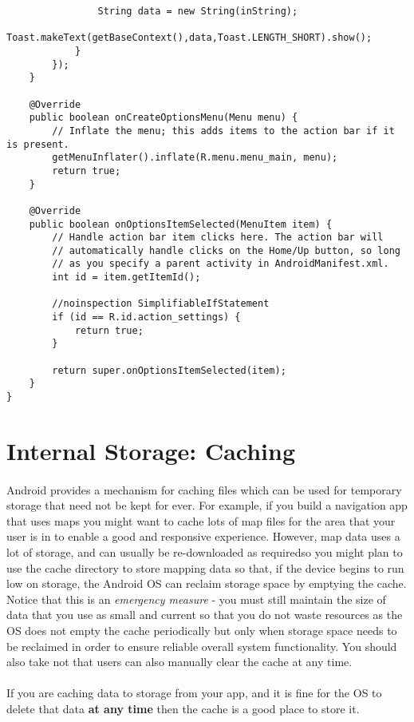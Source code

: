 \begin{lstlisting}
                String data = new String(inString);
                Toast.makeText(getBaseContext(),data,Toast.LENGTH_SHORT).show();
            }
        });
    }

    @Override
    public boolean onCreateOptionsMenu(Menu menu) {
        // Inflate the menu; this adds items to the action bar if it is present.
        getMenuInflater().inflate(R.menu.menu_main, menu);
        return true;
    }

    @Override
    public boolean onOptionsItemSelected(MenuItem item) {
        // Handle action bar item clicks here. The action bar will
        // automatically handle clicks on the Home/Up button, so long
        // as you specify a parent activity in AndroidManifest.xml.
        int id = item.getItemId();

        //noinspection SimplifiableIfStatement
        if (id == R.id.action_settings) {
            return true;
        }

        return super.onOptionsItemSelected(item);
    }
}
\end{lstlisting}

\section{Internal Storage: Caching}
\paragraph{} Android provides a mechanism for caching files which can be used for temporary storage that need not be kept for ever. For example, if you build a navigation app that uses maps you might want to cache lots of map files for the area that your user is in to enable a good and responsive experience. However, map data uses a lot of storage, and can usually be re-downloaded as requiredso you might plan to use the cache directory to store mapping data so that, if the device begins to run low on storage, the Android OS can reclaim storage space by emptying the cache. Notice that this is an {\emph{emergency measure}} - you must still maintain the size of data that you use as small and current so that you do not waste resources as the OS does not empty the cache periodically but only when storage space needs to be reclaimed in order to ensure reliable overall system functionality. You should also take not that users can also manually clear the cache at any time.

\paragraph{} If you are caching data to storage from your app, and it is fine for the OS to delete that data {\bf{at any time}} then the cache is a good place to store it.

